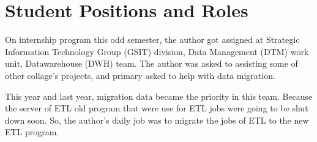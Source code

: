 \section{Student Positions and Roles}
On internship program this odd semester, the author got assigned at Strategic Information Technology Group (GSIT) division, Data Management (DTM) work unit, Datawarehouse (DWH) team. The author was asked to assisting some of other collage's projects, and primary asked to help with data migration.

This year and last year, migration data became the priority in this team. Because the server of ETL old program that were use for ETL jobs were going to be shut down soon. So, the author's daily job was to migrate the jobs of ETL to the new ETL program.
